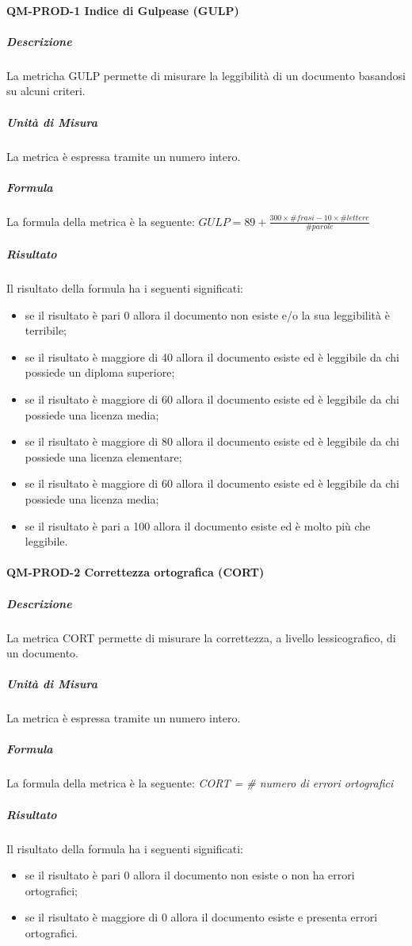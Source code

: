 				\paragraph{QM-PROD-1 Indice di Gulpease (GULP)}
					\subparagraph{Descrizione}
						La metricha GULP permette di misurare la leggibilità di un documento basandosi su alcuni criteri.
					\subparagraph{Unità di Misura}
						La metrica è espressa tramite un numero intero.
					\subparagraph{Formula}
						La formula della metrica è la seguente:
						\(
							GULP = 89+\frac{300\times\# frasi-10\times\#lettere}{\#parole}
						\)
					\subparagraph{Risultato}
						Il risultato della formula ha i seguenti significati:
						\begin{itemize}
							\item se il risultato è pari 0 allora il documento non esiste e/o la sua leggibilità è terribile;
							\item se il risultato è maggiore di 40 allora il documento esiste ed è leggibile da chi possiede un diploma superiore;
							\item se il risultato è maggiore di 60 allora il documento esiste ed è leggibile da chi possiede una licenza media;
							\item se il risultato è maggiore di 80 allora il documento esiste ed è leggibile da chi possiede una licenza elementare;
							\item se il risultato è maggiore di 60 allora il documento esiste ed è leggibile da chi possiede una licenza media;
							\item se il risultato è pari a 100 allora il documento esiste ed è molto più che leggibile.
						\end{itemize}
				\paragraph{QM-PROD-2 Correttezza ortografica (CORT)}
					\subparagraph{Descrizione}
					La metrica CORT permette di misurare la correttezza, a livello lessicografico, di un documento.
					\subparagraph{Unità di Misura}
						La metrica è espressa tramite un numero intero.
					\subparagraph{Formula}
						La formula della metrica è la seguente:
						\textit{CORT = \# numero di errori ortografici}
					\subparagraph{Risultato}
						Il risultato della formula ha i seguenti significati:
						\begin{itemize}
							\item se il risultato è pari 0 allora il documento non esiste o non ha errori ortografici;
							\item se il risultato è maggiore di 0 allora il documento esiste e presenta errori ortografici.
						\end{itemize}
